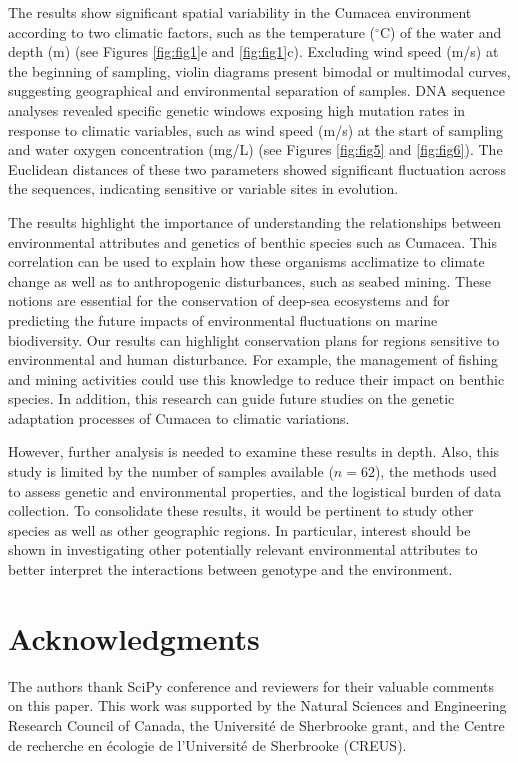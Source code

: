 The results show significant spatial variability in the Cumacea environment according to two climatic factors, such as the temperature ($^\circ$C) of the water and depth (m) (see Figures \ref{fig:fig1}e and \ref{fig:fig1}c). Excluding wind speed (m/s) at the beginning of sampling, violin diagrams present bimodal or multimodal curves, suggesting geographical and environmental separation of samples. DNA sequence analyses revealed specific genetic windows exposing high mutation rates in response to climatic variables, such as wind speed (m/s) at the start of sampling and water oxygen concentration (mg/L) (see Figures \ref{fig:fig5} and \ref{fig:fig6}). The Euclidean distances of these two parameters showed significant fluctuation across the sequences, indicating sensitive or variable sites in evolution.

The results highlight the importance of understanding the relationships between environmental attributes and genetics of benthic species such as Cumacea. This correlation can be used to explain how these organisms acclimatize to climate change as well as to anthropogenic disturbances, such as seabed mining. These notions are essential for the conservation of deep-sea ecosystems and for predicting the future impacts of environmental fluctuations on marine biodiversity. Our results can highlight conservation plans for regions sensitive to environmental and human disturbance. For example, the management of fishing and mining activities could use this knowledge to reduce their impact on benthic species. In addition, this research can guide future studies on the genetic adaptation processes of Cumacea to climatic variations.

However, further analysis is needed to examine these results in depth. Also, this study is limited by the number of samples available ($n=62$), the methods used to assess genetic and environmental properties, and the logistical burden of data collection. To consolidate these results, it would be pertinent to study other species as well as other geographic regions. In particular, interest should be shown in investigating other potentially relevant environmental attributes to better interpret the interactions between genotype and the environment.

\section{Acknowledgments}\label{acknowledgments}

The authors thank SciPy conference and reviewers for their valuable comments on this paper. This work was supported by the Natural Sciences and Engineering Research Council of Canada, the Université de Sherbrooke grant, and the Centre de recherche en écologie de l’Université de Sherbrooke (CREUS).
